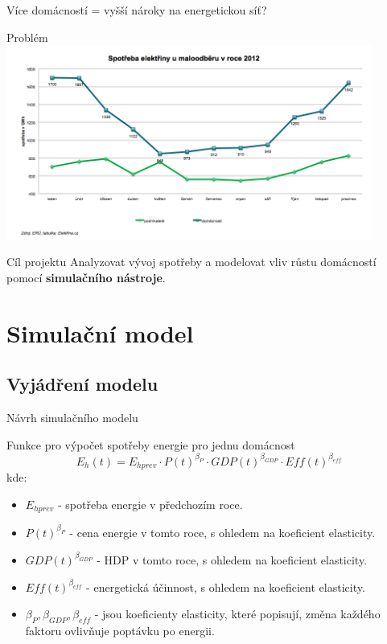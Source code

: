 \documentclass{beamer}
\begin{document}
\begin{frame}{Více domácností = vyšší nároky na energetickou síť?}
{\begin{block}{Problém}
            \centering
            \includegraphics[width=0.9\textwidth]{spotrebaEl.png}
        \end{block}
    }
\end{frame}

\begin{frame}{Cíl projektu}
    Analyzovat vývoj spotřeby a modelovat vliv růstu domácností pomocí \textbf{simulačního nástroje}.
\end{frame}


\section{Simulační model}
\subsection{Vyjádření modelu}
\begin{frame}{Návrh simulačního modelu}
    \begin{block}{Funkce pro výpočet spotřeby energie pro jednu domácnost}
    \[E_h(t) = E_{hprev} \cdot P(t)^{\beta_P} \cdot GDP(t)^{\beta_{GDP}} \cdot Eff(t)^{\beta_{eff}}\]
    kde:
    \begin{itemize}
        \item $E_{hprev}$ - spotřeba energie v předchozím roce.
        \item $P(t)^{\beta_P}$ - cena energie v tomto roce, s ohledem na koeficient elasticity.
        \item $GDP(t)^{\beta_{GDP}}$ - HDP v tomto roce, s ohledem na koeficient elasticity.
        \item $Eff(t)^{\beta_{eff}}$ - energetická účinnost, s ohledem na koeficient elasticity.
        \item $\beta_P, \beta_{GDP}, \beta_{eff}$ - jsou koeficienty elasticity, které popisují, změna každého faktoru ovlivňuje poptávku po energii.
    \end{itemize}
    \end{block}
\end{frame}
\end{document}
